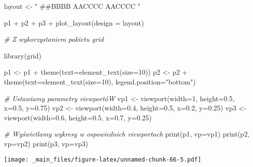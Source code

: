 \documentclass[
]{book}
\newenvironment{Shaded}{\begin{snugshade}}{\end{snugshade}}
\newcommand{\AttributeTok}[1]{\textcolor[rgb]{0.77,0.63,0.00}{#1}}
\newcommand{\CommentTok}[1]{\textcolor[rgb]{0.56,0.35,0.01}{\textit{#1}}}
\newcommand{\DecValTok}[1]{\textcolor[rgb]{0.00,0.00,0.81}{#1}}
\newcommand{\FloatTok}[1]{\textcolor[rgb]{0.00,0.00,0.81}{#1}}
\newcommand{\FunctionTok}[1]{\textcolor[rgb]{0.00,0.00,0.00}{#1}}
\newcommand{\NormalTok}[1]{#1}
\newcommand{\OtherTok}[1]{\textcolor[rgb]{0.56,0.35,0.01}{#1}}
\newcommand{\SpecialCharTok}[1]{\textcolor[rgb]{0.00,0.00,0.00}{#1}}
\newcommand{\StringTok}[1]{\textcolor[rgb]{0.31,0.60,0.02}{#1}}
\begin{document}
\begin{Shaded}
\begin{Highlighting}[]
\NormalTok{layout }\OtherTok{\textless{}{-}} \StringTok{"}
\StringTok{\#\#BBBB}
\StringTok{AACCCC}
\StringTok{AACCCC}
\StringTok{"}

\NormalTok{p1 }\SpecialCharTok{+}\NormalTok{ p2 }\SpecialCharTok{+}\NormalTok{ p3 }\SpecialCharTok{+} 
  \FunctionTok{plot\_layout}\NormalTok{(}\AttributeTok{design =}\NormalTok{ layout)}

\CommentTok{\# Z wykorzystaniem pakietu grid}

\FunctionTok{library}\NormalTok{(grid)}

\NormalTok{p1 }\OtherTok{\textless{}{-}}\NormalTok{ p1 }\SpecialCharTok{+} \FunctionTok{theme}\NormalTok{(}\AttributeTok{text=}\FunctionTok{element\_text}\NormalTok{(}\AttributeTok{size=}\DecValTok{10}\NormalTok{))}
\NormalTok{p2 }\OtherTok{\textless{}{-}}\NormalTok{ p2 }\SpecialCharTok{+} \FunctionTok{theme}\NormalTok{(}\AttributeTok{text=}\FunctionTok{element\_text}\NormalTok{(}\AttributeTok{size=}\DecValTok{10}\NormalTok{), }\AttributeTok{legend.position=}\StringTok{"bottom"}\NormalTok{)}

\CommentTok{\# Ustawiamy parametry viewportóW}
\NormalTok{vp1 }\OtherTok{\textless{}{-}} \FunctionTok{viewport}\NormalTok{(}\AttributeTok{width=}\DecValTok{1}\NormalTok{, }\AttributeTok{height=}\FloatTok{0.5}\NormalTok{, }\AttributeTok{x=}\FloatTok{0.5}\NormalTok{, }\AttributeTok{y=}\FloatTok{0.75}\NormalTok{)}
\NormalTok{vp2 }\OtherTok{\textless{}{-}} \FunctionTok{viewport}\NormalTok{(}\AttributeTok{width=}\FloatTok{0.4}\NormalTok{, }\AttributeTok{height=}\FloatTok{0.5}\NormalTok{, }\AttributeTok{x=}\FloatTok{0.2}\NormalTok{, }\AttributeTok{y=}\FloatTok{0.25}\NormalTok{)}
\NormalTok{vp3 }\OtherTok{\textless{}{-}} \FunctionTok{viewport}\NormalTok{(}\AttributeTok{width=}\FloatTok{0.6}\NormalTok{, }\AttributeTok{height=}\FloatTok{0.5}\NormalTok{, }\AttributeTok{x=}\FloatTok{0.7}\NormalTok{, }\AttributeTok{y=}\FloatTok{0.25}\NormalTok{)}

\CommentTok{\# Wyświetlamy wykresy w ospowiednich viewportach}
\FunctionTok{print}\NormalTok{(p1, }\AttributeTok{vp=}\NormalTok{vp1)}
\FunctionTok{print}\NormalTok{(p2, }\AttributeTok{vp=}\NormalTok{vp2)}
\FunctionTok{print}\NormalTok{(p3, }\AttributeTok{vp=}\NormalTok{vp3)}
\end{Highlighting}
\end{Shaded}

\texttt{[image: \_main\_files/figure-latex/unnamed-chunk-66-5.pdf]}
\end{document}
